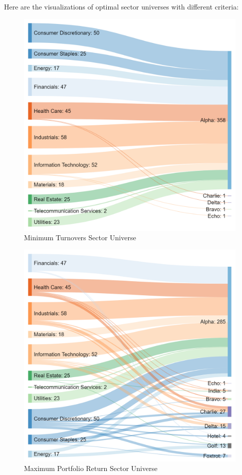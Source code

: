 \documentclass[../main.tex]{subfiles}
\begin{document}
Here are the visualizations of optimal sector universes with different criteria:

\begin{figure}[H]
    \centering
    \includegraphics[scale=0.2]{images/single_2017_5.png}
    \caption{Minimum Turnovers Sector Universe}
    \label{fig:optimal_sector_universes:min_turnover}
\end{figure} 

\begin{figure}[H]
    \centering
    \includegraphics[scale=0.2]{images/complete_2017_9.png}
    \caption{Maximum Portfolio Return Sector Universe}
    \label{fig:optimal_sector_universes:max_return}
\end{figure}
\end{document}
